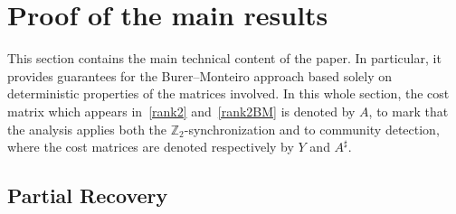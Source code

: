 \documentclass{colt2016} %
\newcommand{\reals}{{\mathbb{R}}}
\newcommand{\Rn}{{\mathbb{R}^n}}
\newcommand{\1}{\mathbf{1}}
\newcommand{\TODO}[1]{{\color{red}{[#1]}}}
\begin{document}



\section{Proof of the main results}\label{section:mainresults}


This section contains the main technical content of the paper. In particular, it provides guarantees for the Burer--Monteiro approach based solely on deterministic properties of the matrices involved. In this whole section, the cost matrix which appears in~\eqref{rank2} and~\eqref{rank2BM} is denoted by $A$, to mark that the analysis applies both the $\mathbb{Z}_2$-synchronization and to community detection, where the cost matrices are denoted respectively by $Y$ and $A^\sharp$.

%
%
%



\subsection{Partial Recovery}

\end{document}
